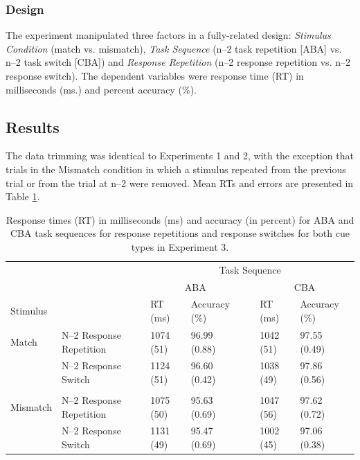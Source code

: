 \documentclass[a4paper, doc, natbib]{apa6}
\begin{document}
\subsubsection{Design}
The experiment manipulated three factors in a fully-related design: \emph{Stimulus Condition} (match vs. mismatch), \emph{Task Sequence} (n--2 task repetition [ABA] vs. n--2 task switch [CBA]) and \emph{Response Repetition} (n--2 response repetition vs. n--2 response switch). The dependent variables were response time (RT) in milliseconds (ms.) and percent accuracy (\%).

\subsection{Results}
The data trimming was identical to Experiments 1 and 2, with the exception that trials in the Mismatch condition in which a stimulus repeated from the previous trial or from the trial at n--2 were removed. Mean RTs and errors are presented in Table \ref{tab:Experiment3}.

\begin{table}[htbp]
\centering
\caption{Response times (RT) in milliseconds (ms) and accuracy (in percent) for ABA and CBA task sequences for response repetitions and response switches for both cue types in Experiment 3.}
\begin{tabular}{lllllll}
\hline
         &                          & \multicolumn{5}{c}{Task Sequence}                        \\ \cline{3-7}

         &                          & \multicolumn{2}{c}{ABA}   &  & \multicolumn{2}{c}{CBA}   \\\cline{3-4}
\cline{6-7}

Stimulus &                          & RT (ms)   & Accuracy (\%) &  & RT (ms)   & Accuracy (\%) \\ \hline
Match   & N--2 Response Repetition & 1074 (51) & 96.99 (0.88)  &  & 1042 (51)  & 97.55 (0.49)  \\
         & N--2 Response Switch     & 1124 (51)  & 96.60 (0.42)  &  & 1038 (49)  & 97.86 (0.56)  \\
         &                          &           &               &  &           &               \\
Mismatch   & N--2 Response Repetition & 1075 (50) & 95.63 (0.69)  &  & 1047 (56) & 97.62 (0.72)  \\
         & N--2 Response Switch     & 1131 (49) & 95.47 (0.69)  &  & 1002 (45) & 97.06 (0.38) \\
\hline
\end{tabular}
\label{tab:Experiment3}
\end{table}
\end{document}

